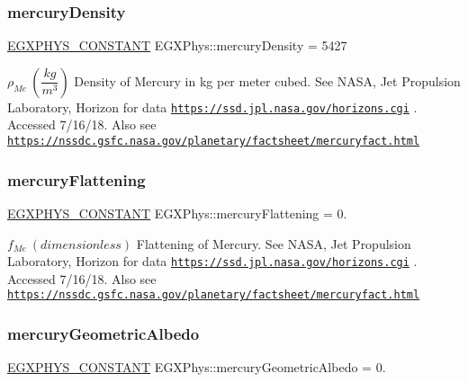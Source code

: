 \subsubsection{\texorpdfstring{mercury\+Density}{mercuryDensity}}
{\footnotesize\ttfamily \mbox{\hyperlink{group___e_g_x_phys-_constants-_macros_ga76980d288494ce1714c9ac68a95ba702}{E\+G\+X\+P\+H\+Y\+S\+\_\+\+C\+O\+N\+S\+T\+A\+NT}} E\+G\+X\+Phys\+::mercury\+Density = 5427}

$\rho_{Me} \ (\dfrac{kg}{m^3})$ Density of Mercury in kg per meter cubed. See N\+A\+SA, Jet Propulsion Laboratory, Horizon for data \href{https://ssd.jpl.nasa.gov/horizons.cgi}{\tt https\+://ssd.\+jpl.\+nasa.\+gov/horizons.\+cgi} . Accessed 7/16/18. Also see \href{https://nssdc.gsfc.nasa.gov/planetary/factsheet/mercuryfact.html}{\tt https\+://nssdc.\+gsfc.\+nasa.\+gov/planetary/factsheet/mercuryfact.\+html} \mbox{\label{group___e_g_x_phys-_constants-_astrophysics-_solar_system-_mercury-_bulk_gab49932a46762c50bdbad579ea1b891bd}} 
\subsubsection{\texorpdfstring{mercury\+Flattening}{mercuryFlattening}}
{\footnotesize\ttfamily \mbox{\hyperlink{group___e_g_x_phys-_constants-_macros_ga76980d288494ce1714c9ac68a95ba702}{E\+G\+X\+P\+H\+Y\+S\+\_\+\+C\+O\+N\+S\+T\+A\+NT}} E\+G\+X\+Phys\+::mercury\+Flattening = 0.}

$f_{Me} \ (dimensionless)$ Flattening of Mercury. See N\+A\+SA, Jet Propulsion Laboratory, Horizon for data \href{https://ssd.jpl.nasa.gov/horizons.cgi}{\tt https\+://ssd.\+jpl.\+nasa.\+gov/horizons.\+cgi} . Accessed 7/16/18. Also see \href{https://nssdc.gsfc.nasa.gov/planetary/factsheet/mercuryfact.html}{\tt https\+://nssdc.\+gsfc.\+nasa.\+gov/planetary/factsheet/mercuryfact.\+html} \mbox{\label{group___e_g_x_phys-_constants-_astrophysics-_solar_system-_mercury-_bulk_ga98cc52c8bad157ae9ec6be798afb261c}} 
\subsubsection{\texorpdfstring{mercury\+Geometric\+Albedo}{mercuryGeometricAlbedo}}
{\footnotesize\ttfamily \mbox{\hyperlink{group___e_g_x_phys-_constants-_macros_ga76980d288494ce1714c9ac68a95ba702}{E\+G\+X\+P\+H\+Y\+S\+\_\+\+C\+O\+N\+S\+T\+A\+NT}} E\+G\+X\+Phys\+::mercury\+Geometric\+Albedo = 0.}

